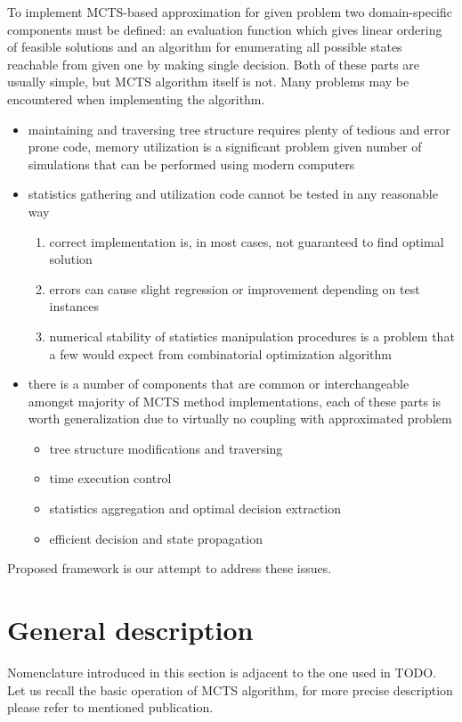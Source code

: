 To implement MCTS-based approximation for given problem two domain-specific
components must be defined: an evaluation function which gives linear ordering
of feasible solutions and an algorithm for enumerating all possible states
reachable from given one by making single decision.
Both of these parts are usually simple, but MCTS algorithm itself is not. Many
problems may be encountered when implementing the algorithm.
\begin{itemize}
  \item maintaining and traversing tree structure requires plenty of tedious
    and error prone code, memory utilization is a significant problem given
    number of simulations that can be performed using modern computers
  \item statistics gathering and utilization code cannot be tested in any reasonable way
    \begin{enumerate}
      \item correct implementation is, in most cases, not guaranteed to find optimal solution
      \item errors can cause slight regression or improvement depending on test instances
      \item numerical stability of statistics manipulation procedures is a
      problem that a few would expect from combinatorial optimization algorithm
    \end{enumerate}
  \item there is a number of components that are common or interchangeable
    amongst majority of MCTS method implementations, each of these parts is
    worth generalization due to virtually no coupling with approximated problem
    \begin{itemize}
      \item tree structure modifications and traversing
      \item time execution control
      \item statistics aggregation and optimal decision extraction
      \item efficient decision and state propagation
    \end{itemize}
\end{itemize}

Proposed framework is our attempt to address these issues.

\section{General description}
Nomenclature introduced in this section is adjacent to the one used in TODO.
Let us recall the basic operation of MCTS algorithm, for more precise
description please refer to mentioned publication.

